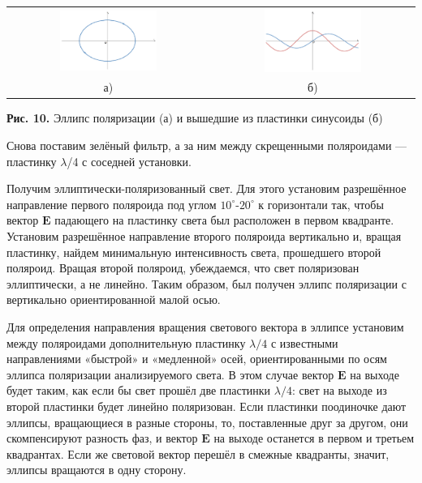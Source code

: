 \documentclass[a4paper,12pt]{article} %
\begin{document}
\hfill \break \begin{center}
\begin{tabular}{cc}
\includegraphics[width=0.5\textwidth]{4.7.3_9.png}&\includegraphics[width=0.5\textwidth]{4.7.3_10.png}\\
а) & б)\\
\end{tabular}
\hfill \break \textbf {Рис. 10.} Эллипс поляризации (а) и вышедшие из пластинки синусоиды (б) \\
\end{center}	
	
\hfill \break Снова поставим зелёный фильтр, а за ним между скрещенными поляроидами — пластинку $\lambda$/4 с соседней установки.
		
\hfill \break Получим эллиптически-поляризованный свет. Для этого установим разрешённое направление первого поляроида под углом $10^\circ$-$20^\circ$ к горизонтали так, чтобы вектор $\boldsymbol{E}$ падающего на пластинку света был расположен в первом квадранте. Установим разрешённое направление второго поляроида вертикально и, вращая пластинку, найдем минимальную интенсивность света, прошедшего второй поляроид. Вращая второй поляроид, убеждаемся, что свет поляризован эллиптически, а не линейно. Таким образом, был получен эллипс поляризации с вертикально ориентированной малой осью.

\hfill \break Для определения направления вращения светового вектора в эллипсе установим между поляроидами дополнительную пластинку $\lambda/4$ с известными направлениями «быстрой» и «медленной» осей, ориентированными по осям эллипса поляризации анализируемого света. В этом случае вектор $\boldsymbol{E}$ на выходе будет таким, как если бы свет прошёл две пластинки $\lambda/4$: свет на выходе из второй пластинки будет линейно поляризован. Если пластинки поодиночке дают эллипсы, вращающиеся в разные стороны, то, поставленные друг за другом, они скомпенсируют разность фаз, и вектор $\boldsymbol{E}$ на выходе останется в первом и третьем квадрантах. Если же световой вектор перешёл в смежные квадранты, значит, эллипсы вращаются в одну сторону.
		
\end{document}
